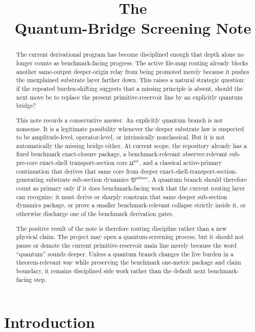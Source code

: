 \documentclass[11pt]{article}
\title{\textbf{The \TheoryName{}}\\[0.4em]
\large Quantum-Bridge Screening Note}
\author{}
\date{}
\newcommand{\SubPreSectionCore}{\mathfrak U^{\mathrm{sec}}}
\newcommand{\SubSectionPackage}{\mathfrak V^{\mathrm{subsec}}}
\begin{document}
\maketitle

\begin{abstract}
The current derivational program has become disciplined enough that depth alone no longer counts as benchmark-facing progress. The active file-map routing already blocks another same-output deeper-origin relay from being promoted merely because it pushes the unexplained substrate layer farther down. This raises a natural strategic question: if the repeated burden-shifting suggests that a missing principle is absent, should the next move be to replace the present primitive-reservoir line by an explicitly quantum bridge?

This note records a conservative answer. An explicitly quantum branch is not nonsense. It is a legitimate possibility whenever the deeper substrate law is suspected to be amplitude-level, operator-level, or intrinsically nonclassical. But it is not automatically the missing bridge either. At current scope, the repository already has a fixed benchmark exact-closure package, a benchmark-relevant observer-relevant sub-pre-core exact-shell transport-section core \(\SubPreSectionCore\), and a classical active-primary continuation that derives that same core from deeper exact-shell-transport-section-generating substrate sub-section dynamics \(\SubSectionPackage\). A quantum branch should therefore count as primary only if it does benchmark-facing work that the current routing layer can recognize: it must derive or sharply constrain that same deeper sub-section dynamics package, or prove a smaller benchmark-relevant collapse strictly inside it, or otherwise discharge one of the benchmark derivation gates.

The positive result of the note is therefore routing discipline rather than a new physical claim. The project may open a quantum-screening process, but it should not pause or demote the current primitive-reservoir main line merely because the word ``quantum'' sounds deeper. Unless a quantum branch changes the live burden in a theorem-relevant way while preserving the benchmark one-metric package and claim boundary, it remains disciplined side work rather than the default next benchmark-facing step.
\end{abstract}

\section{Introduction}
\end{document}
